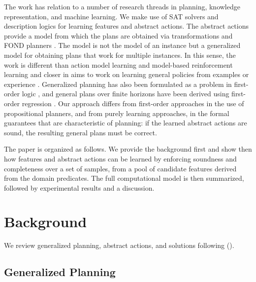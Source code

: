 \documentclass[letterpaper]{article} %
\newcommand{\citeay}[1]{\citeauthor{#1} (\citeyear{#1})}
\begin{document}
The work has relation to a number of research threads in planning, knowledge
representation, and machine learning. We make use of SAT solvers and description
logics for learning features and abstract actions. %
The abstract actions provide a model from which the plans are obtained via
transformations and FOND planners \cite{geffner:book,ghallab:book}.
The model is not the model of an instance but a generalized model for obtaining
plans that work for multiple instances. In this sense, the work is different than
action model learning \cite{yang:action-learning} and model-based reinforcement
learning and closer in aims to work on learning general policies from examples or
experience \cite{martin-geffner:generalized,fern:bias,mazebase,general-drl}.
Generalized planning has also been formulated as a problem in first-order logic
\cite{srivastava:generalized}, and general plans over finite horizons have been
derived using first-order regression \cite{boutilier2001symbolic,wang2008first,van2012solving}.
Our approach differs from first-order approaches in the use of propositional
planners, and from purely learning approaches, in the formal guarantees that
are characteristic of planning: if the learned abstract actions are  sound,
the resulting general plans must be correct. 

The paper is organized as follows. We provide the background  first and show then
how features and abstract actions can be learned by enforcing soundness and
completeness over a set of samples, from a pool of candidate features derived from the domain
predicates. The full computational model is then summarized, followed by experimental results
and a discussion.


\section{Background}

We review generalized planning, abstract actions, and solutions following  \citeay{bonet:ijcai2018}.


\subsection{Generalized Planning}
\end{document}
